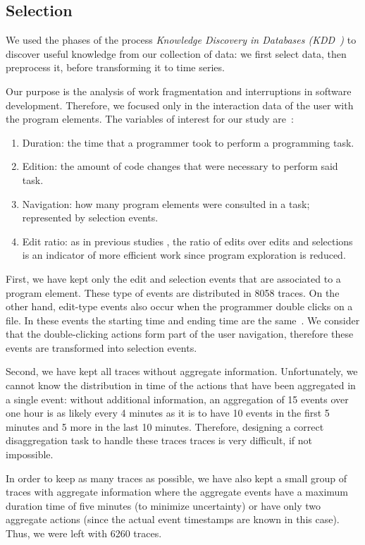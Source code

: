 \documentclass[times]{smrauth}
\begin{document}
	
\subsection{Selection}
We used the phases of the process \textit{Knowledge Discovery in Databases (KDD~\cite{FPP96})} to discover useful knowledge from our collection of data: we first select data, then preprocess it, before transforming it to time series.

Our purpose is the analysis of work fragmentation and interruptions in software development. Therefore, we focused only in the interaction data of the user with the program elements. The  variables of interest for our study are~\cite{RD13}:
\begin{enumerate}
	\item Duration: the time that a programmer took to perform a programming task. 
	\item Edition:  the amount of code changes that were necessary to perform said task. %
	\item Navigation: how many program elements were consulted in a task; represented by selection events.
	\item Edit ratio: as in previous studies \cite{KM06}, the ratio of edits over edits and selections is an indicator of more efficient work since program exploration is reduced.
\end{enumerate}

First, we have kept only the edit and selection events that are associated to a program element. These type of events are distributed in 8058 traces. On the other hand, edit-type events also occur when the programmer double clicks on a file. In these events the starting time and ending time are the same~\cite{LJD11}. We consider that the double-clicking actions form part of the user navigation, therefore these events are transformed into selection events.  

Second, we have kept all traces without aggregate information. Unfortunately, we cannot know the distribution in time of the actions that have been aggregated in a single event: without additional information, an aggregation of 15 events over one hour is as likely every 4 minutes as it is to have 10 events in the first 5 minutes and 5 more in the last 10 minutes. Therefore, designing a correct disaggregation task to handle these traces traces is very difficult, if not impossible.

In order to keep as many traces as possible, we have also kept a small group of traces with aggregate information where the aggregate events have a maximum duration time of five minutes (to minimize uncertainty) or have only two aggregate actions (since the actual event timestamps are known in this case). Thus, we were left with 6260 traces.
\end{document}
